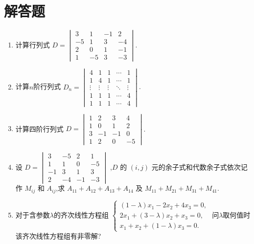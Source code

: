 \section{解答题}
\begin{enumerate}
	
	\item 计算行列式 $D =
	\begin{vmatrix}
		3 & 1 & -1 & 2 \\
		-5 & 1 & 3 & -4 \\
		2 & 0 & 1 & -1 \\
		1 & -5 & 3 & -3
	\end{vmatrix}$.
	
	\item 计算$n$阶行列式 $D_n =
	\begin{vmatrix}
		4 & 1 & 1 & \cdots & 1 \\
		1 & 4 & 1 & \cdots & 1 \\
		\vdots & \vdots & \vdots & \ddots & \vdots \\
		1 & 1 & 1 & \cdots & 4 \\
		1 & 1 & 1 & \cdots & 4
	\end{vmatrix}$.
	
	\item 计算四阶行列式 $D =
	\begin{vmatrix}
		1 & 2 & 3 & 4 \\
		1 & 0 & 1 & 2 \\
		3 & -1 & -1 & 0 \\
		1 & 2 & 0 & -5
	\end{vmatrix}$.
	
	\item 设 $D =
	\begin{vmatrix}
		3 & -5 & 2 & 1 \\
		1 & 1 & 0 & -5 \\
		-1 & 3 & 1 & 3 \\
		2 & -4 & -1 & -3
	\end{vmatrix}$
	,$D$ 的 $(i,j)$ 元的余子式和代数余子式依次记作 $M_{ij}$ 和 $A_{ij}$,求
	$A_{11} + A_{12} + A_{13} + A_{14}$ 及 $M_{11} + M_{21} + M_{31} + M_{41}$.
	
	
	
	\item 对于含参数$\lambda$的齐次线性方程组
	$
	\begin{cases}
		(1-\lambda)x_1 - 2x_2 + 4x_3 = 0, \\
		2x_1 + (3-\lambda)x_2 + x_3 = 0, \\
		x_1 + x_2 + (1-\lambda)x_3 = 0.
	\end{cases}
	$
	问$\lambda$取何值时该齐次线性方程组有非零解?
	

\end{enumerate}
